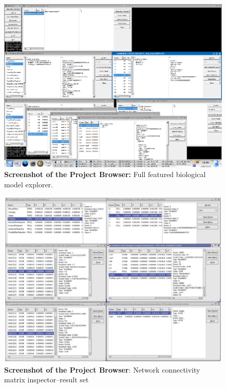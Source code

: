 \documentclass[12pt]{article}
\begin{document}
\begin{figure}[h]
  \centering
 \includegraphics[scale=3.5]{figures/screenshot-5.eps}
  \caption{{\bf Screenshot of the Project Browser:} Full featured biological model explorer.}
  \label{fig:pb-5}
\end{figure}

\begin{figure}[h]
  \centering
 \includegraphics[scale=0.6]{figures/screenshot-6.eps}
  \caption{{\bf Screenshot of the Project Browser}: Network connectivity matrix inspector--result set}
  \label{fig:pb-6}
\end{figure}
\end{document}
